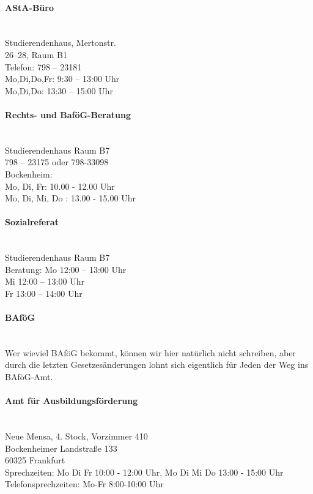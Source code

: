 \paragraph{AStA-Büro}~\\
Studierendenhaus, Mertonstr.\\
26–28, Raum B1\\
Telefon: 798 – 23181\\
Mo,Di,Do,Fr: 9:30 -- 13:00 Uhr\\
Mo,Di,Do: 13:30 -- 15:00 Uhr


\paragraph{Rechts- und BaföG-Beratung}~\\
Studierendenhaus Raum B7\\
798 – 23175 oder 798-33098\\
Bockenheim:\\
Mo, Di, Fr: 10.00 - 12.00 Uhr\\
Mo, Di, Mi, Do : 13.00 - 15.00 Uhr


\paragraph{Sozialreferat}~\\
Studierendenhaus Raum B7\\
Beratung: Mo 12:00 -- 13:00 Uhr\\
Mi 12:00 -- 13:00 Uhr\\
Fr 13:00 -- 14:00 Uhr


\paragraph{BAföG}~\\
Wer wieviel BAföG bekommt, können wir hier natürlich nicht schreiben, aber durch die letzten Gesetzesänderungen lohnt sich eigentlich für Jeden der Weg ins BAföG-Amt.

\paragraph{Amt für Ausbildungsförderung}~\\
Neue Mensa, 4. Stock, Vorzimmer 410\\
Bockenheimer Landstraße 133\\
60325 Frankfurt\\
Sprechzeiten: Mo Di Fr 10:00 - 12:00 Uhr, Mo Di Mi Do 13:00 - 15:00 Uhr
Telefonsprechzeiten: Mo-Fr 8:00-10:00 Uhr\\

